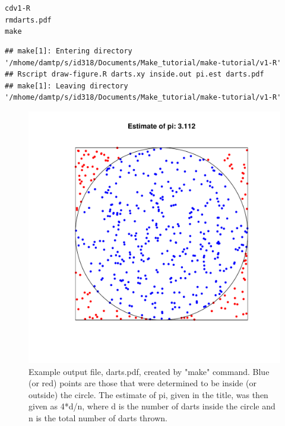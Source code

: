 \documentclass[12pt]{article}\usepackage[]{graphicx}\usepackage[]{color}
\makeatletter
\newenvironment{kframe}{%
 \def\at@end@of@kframe{}%
 \ifinner\ifhmode%
  \def\at@end@of@kframe{\end{minipage}}%
  \begin{minipage}{\columnwidth}%
 \fi\fi%
 \def\FrameCommand##1{\hskip\@totalleftmargin \hskip-\fboxsep
 \colorbox{shadecolor}{##1}\hskip-\fboxsep
     \hskip-\linewidth \hskip-\@totalleftmargin \hskip\columnwidth}%
 \MakeFramed {\advance\hsize-\width
   \@totalleftmargin\z@ \linewidth\hsize
   \@setminipage}}%
 {\par\unskip\endMakeFramed%
 \at@end@of@kframe}
\newenvironment{knitrout}{}{} %
\makeatother
\begin{document}
\begin{knitrout}
\color{fgcolor}\begin{kframe}
\begin{alltt}
cd v1-R
rm darts.pdf
make
\end{alltt}

\begin{verbatim}
## make[1]: Entering directory '/mhome/damtp/s/id318/Documents/Make_tutorial/make-tutorial/v1-R'
## Rscript draw-figure.R darts.xy inside.out pi.est darts.pdf
## make[1]: Leaving directory '/mhome/damtp/s/id318/Documents/Make_tutorial/make-tutorial/v1-R'
\end{verbatim}
\end{kframe}
\end{knitrout}



\begin{figure}
  \centering
	\includegraphics{v1-R/darts.pdf}
  \caption{Example output file, darts.pdf, created by "make" command.
  Blue (or red) points are those that were determined to be inside (or
  outside) the circle.  The estimate of pi, given in the title, was
  then given as 4*d/n, where d is the number of darts inside the
  circle and n is the total number of darts thrown.}
  \label{fig:darts}
\end{figure}
\end{document}
